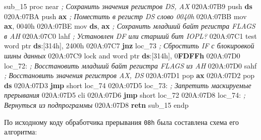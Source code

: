 \documentclass[
]{article}
\newenvironment{Shaded}{}{}
\newcommand{\BaseNTok}[1]{\textcolor[rgb]{0.25,0.63,0.44}{#1}}
\newcommand{\BuiltInTok}[1]{\textcolor[rgb]{0.00,0.50,0.00}{#1}}
\newcommand{\CommentTok}[1]{\textcolor[rgb]{0.38,0.63,0.69}{\textit{#1}}}
\newcommand{\ControlFlowTok}[1]{\textcolor[rgb]{0.00,0.44,0.13}{\textbf{#1}}}
\newcommand{\DataTypeTok}[1]{\textcolor[rgb]{0.56,0.13,0.00}{#1}}
\newcommand{\DecValTok}[1]{\textcolor[rgb]{0.25,0.63,0.44}{#1}}
\newcommand{\ErrorTok}[1]{\textcolor[rgb]{1.00,0.00,0.00}{\textbf{#1}}}
\newcommand{\KeywordTok}[1]{\textcolor[rgb]{0.00,0.44,0.13}{\textbf{#1}}}
\newcommand{\NormalTok}[1]{#1}
\newcommand{\OperatorTok}[1]{\textcolor[rgb]{0.40,0.40,0.40}{#1}}
\begin{document}
\begin{Shaded}
\begin{Highlighting}[]
\NormalTok{sub\_15 proc }\OperatorTok{near}
\CommentTok{; Сохранить значения регистров DS, AX}
\NormalTok{020A:07B9 }\BuiltInTok{push} \KeywordTok{ds}
\NormalTok{020A:07BA }\BuiltInTok{push} \KeywordTok{ax}
\CommentTok{; Поместить в регистр DS слово 0040h}
\NormalTok{020A:07BB }\BuiltInTok{mov} \KeywordTok{ax}\OperatorTok{,} \BaseNTok{0040h}
\NormalTok{020A:07BE }\BuiltInTok{mov} \KeywordTok{ds}\OperatorTok{,} \KeywordTok{ax}
\CommentTok{; Сохранить младший байт регистра FLAGS в AH}
\NormalTok{020A:07C0 }\BuiltInTok{lahf}
\CommentTok{; Установлен DF или старший бит IOPL?}
\NormalTok{020A:07C1 }\BuiltInTok{test} \DataTypeTok{word} \DataTypeTok{ptr} \KeywordTok{ds}\OperatorTok{:[}\BaseNTok{314h}\OperatorTok{],} \BaseNTok{2400h}
\NormalTok{020A:07C7 }\ControlFlowTok{jnz}\NormalTok{ loc\_73}
\CommentTok{; Сбростить IF с блокировкой шины данных}
\NormalTok{020A:07C9 }\BuiltInTok{lock} \OperatorTok{and} \DataTypeTok{word} \DataTypeTok{ptr} \KeywordTok{ds}\OperatorTok{:[}\BaseNTok{314h}\OperatorTok{],} \DecValTok{0}\ErrorTok{FDFFh}
\NormalTok{020A:07D0 loc\_72}\OperatorTok{:}
\CommentTok{; Восстановить младший байт регистра FLAGS из AH}
\NormalTok{020A:07D0 }\BuiltInTok{sahf}
\CommentTok{; Восстановить значения регистров AX, DS}
\NormalTok{020A:07D1 }\BuiltInTok{pop} \KeywordTok{ax}
\NormalTok{020A:07D2 }\BuiltInTok{pop} \KeywordTok{ds}
\NormalTok{020A:07D3 }\ControlFlowTok{jmp} \OperatorTok{short}\NormalTok{ loc\_74}
\NormalTok{020A:07D5 loc\_73}\OperatorTok{:}
\CommentTok{; Запретить маскируемые прерывания}
\NormalTok{020A:07D5 }\BuiltInTok{cli}
\NormalTok{020A:07D6 }\ControlFlowTok{jmp} \OperatorTok{short}\NormalTok{ loc\_72}
\NormalTok{020A:07D8 loc\_74}\OperatorTok{:}
\CommentTok{; Вернуться из подпрограммы}
\NormalTok{020A:07D8 }\ControlFlowTok{retn}
\NormalTok{sub\_15 endp}
\end{Highlighting}
\end{Shaded}

По исходному коду обработчика прерывания \texttt{08h} была составлена
схема его алгоритма:
\end{document}

